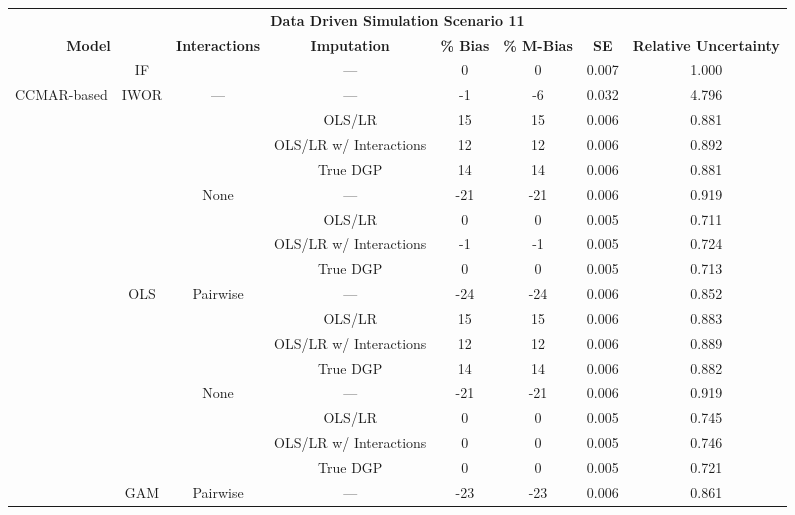 \begin{table}
\centering
\begin{tabular}[ht]{|>{}c|c|c|c|c|c|c|>{}c|}
\hline
\multicolumn{8}{|c|}{\textbf{Data Driven Simulation Scenario 11}} \\
\cline{1-8}
\multicolumn{2}{|c|}{\textbf{Model}} & \textbf{Interactions} & \textbf{Imputation} & \textbf{\% Bias} & \textbf{\% M-Bias} & \textbf{SE} & \textbf{Relative Uncertainty}\\
\hline
 & IF &  & --- & 0 & 0 & 0.007 & 1.000\\
\cline{2-2}
\cline{4-8}
\multirow{-2}{*}{\centering\arraybackslash CCMAR-based} & IWOR & \multirow{-2}{*}{\centering\arraybackslash ---} & --- & -1 & -6 & 0.032 & 4.796\\
\cline{1-8}
 &  &  & OLS/LR & 15 & 15 & 0.006 & 0.881\\
\cline{4-8}
 &  &  & OLS/LR w/ Interactions & 12 & 12 & 0.006 & 0.892\\
\cline{4-8}
 &  &  & True DGP & 14 & 14 & 0.006 & 0.881\\
\cline{4-8}
 &  & \multirow{-4}{*}{\centering\arraybackslash None} & --- & -21 & -21 & 0.006 & 0.919\\
\cline{3-8}
 &  &  & OLS/LR & 0 & 0 & 0.005 & 0.711\\
\cline{4-8}
 &  &  & OLS/LR w/ Interactions & -1 & -1 & 0.005 & 0.724\\
\cline{4-8}
 &  &  & True DGP & 0 & 0 & 0.005 & 0.713\\
\cline{4-8}
 & \multirow{-8}{*}{\centering\arraybackslash OLS} & \multirow{-4}{*}{\centering\arraybackslash Pairwise} & --- & -24 & -24 & 0.006 & 0.852\\
\cline{2-8}
 &  &  & OLS/LR & 15 & 15 & 0.006 & 0.883\\
\cline{4-8}
 &  &  & OLS/LR w/ Interactions & 12 & 12 & 0.006 & 0.889\\
\cline{4-8}
 &  &  & True DGP & 14 & 14 & 0.006 & 0.882\\
\cline{4-8}
 &  & \multirow{-4}{*}{\centering\arraybackslash None} & --- & -21 & -21 & 0.006 & 0.919\\
\cline{3-8}
 &  &  & OLS/LR & 0 & 0 & 0.005 & 0.745\\
\cline{4-8}
 &  &  & OLS/LR w/ Interactions & 0 & 0 & 0.005 & 0.746\\
\cline{4-8}
 &  &  & True DGP & 0 & 0 & 0.005 & 0.721\\
\cline{4-8}
 & \multirow{-8}{*}{\centering\arraybackslash GAM} & \multirow{-4}{*}{\centering\arraybackslash Pairwise} & --- & -23 & -23 & 0.006 & 0.861\\

\end{tabular}
\end{table}
